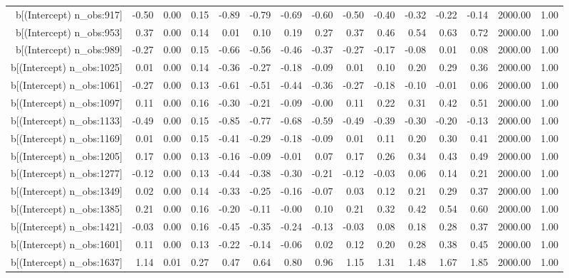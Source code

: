 \begin{table}[ht]
\begin{tabular}{rrrrrrrrrrrrrrr}
  b[(Intercept) n\_obs:917] & -0.50 & 0.00 & 0.15 & -0.89 & -0.79 & -0.69 & -0.60 & -0.50 & -0.40 & -0.32 & -0.22 & -0.14 & 2000.00 & 1.00 \\ 
  b[(Intercept) n\_obs:953] & 0.37 & 0.00 & 0.14 & 0.01 & 0.10 & 0.19 & 0.27 & 0.37 & 0.46 & 0.54 & 0.63 & 0.72 & 2000.00 & 1.00 \\ 
  b[(Intercept) n\_obs:989] & -0.27 & 0.00 & 0.15 & -0.66 & -0.56 & -0.46 & -0.37 & -0.27 & -0.17 & -0.08 & 0.01 & 0.08 & 2000.00 & 1.00 \\ 
  b[(Intercept) n\_obs:1025] & 0.01 & 0.00 & 0.14 & -0.36 & -0.27 & -0.18 & -0.09 & 0.01 & 0.10 & 0.20 & 0.29 & 0.36 & 2000.00 & 1.00 \\ 
  b[(Intercept) n\_obs:1061] & -0.27 & 0.00 & 0.13 & -0.61 & -0.51 & -0.44 & -0.36 & -0.27 & -0.18 & -0.10 & -0.01 & 0.06 & 2000.00 & 1.00 \\ 
  b[(Intercept) n\_obs:1097] & 0.11 & 0.00 & 0.16 & -0.30 & -0.21 & -0.09 & -0.00 & 0.11 & 0.22 & 0.31 & 0.42 & 0.51 & 2000.00 & 1.00 \\ 
  b[(Intercept) n\_obs:1133] & -0.49 & 0.00 & 0.15 & -0.85 & -0.77 & -0.68 & -0.59 & -0.49 & -0.39 & -0.30 & -0.20 & -0.13 & 2000.00 & 1.00 \\ 
  b[(Intercept) n\_obs:1169] & 0.01 & 0.00 & 0.15 & -0.41 & -0.29 & -0.18 & -0.09 & 0.01 & 0.11 & 0.20 & 0.30 & 0.41 & 2000.00 & 1.00 \\ 
  b[(Intercept) n\_obs:1205] & 0.17 & 0.00 & 0.13 & -0.16 & -0.09 & -0.01 & 0.07 & 0.17 & 0.26 & 0.34 & 0.43 & 0.49 & 2000.00 & 1.00 \\ 
  b[(Intercept) n\_obs:1277] & -0.12 & 0.00 & 0.13 & -0.44 & -0.38 & -0.30 & -0.21 & -0.12 & -0.03 & 0.06 & 0.14 & 0.21 & 2000.00 & 1.00 \\ 
  b[(Intercept) n\_obs:1349] & 0.02 & 0.00 & 0.14 & -0.33 & -0.25 & -0.16 & -0.07 & 0.03 & 0.12 & 0.21 & 0.29 & 0.37 & 2000.00 & 1.00 \\ 
  b[(Intercept) n\_obs:1385] & 0.21 & 0.00 & 0.16 & -0.20 & -0.11 & -0.00 & 0.10 & 0.21 & 0.32 & 0.42 & 0.54 & 0.60 & 2000.00 & 1.00 \\ 
  b[(Intercept) n\_obs:1421] & -0.03 & 0.00 & 0.16 & -0.45 & -0.35 & -0.24 & -0.13 & -0.03 & 0.08 & 0.18 & 0.28 & 0.37 & 2000.00 & 1.00 \\ 
  b[(Intercept) n\_obs:1601] & 0.11 & 0.00 & 0.13 & -0.22 & -0.14 & -0.06 & 0.02 & 0.12 & 0.20 & 0.28 & 0.38 & 0.45 & 2000.00 & 1.00 \\ 
  b[(Intercept) n\_obs:1637] & 1.14 & 0.01 & 0.27 & 0.47 & 0.64 & 0.80 & 0.96 & 1.15 & 1.31 & 1.48 & 1.67 & 1.85 & 2000.00 & 1.00 \\ 

\end{tabular}
\end{table}
